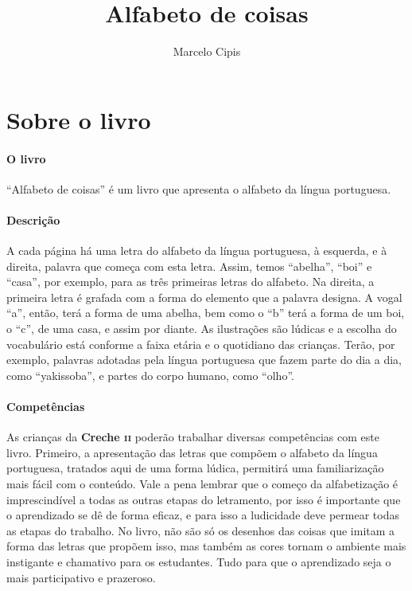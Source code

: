 \documentclass[11pt]{extarticle}
\newcommand{\AutorLivro}{Marcelo Cipis}
\newcommand{\TituloLivro}{Alfabeto de coisas}
\newcommand{\colaborador}{{Paulo Pompermaier e Renier Silva}}
\begin{document}
\title{\TituloLivro}
\author{\AutorLivro}
\def\authornotes{\colaborador}

\date{}
\maketitle


\tableofcontents



\section{Sobre o livro}

\paragraph{O livro} 
``Alfabeto de coisas'' é um livro que apresenta o alfabeto da língua portuguesa. 

\paragraph{Descrição} 
A cada página há uma letra do alfabeto da língua portuguesa, à esquerda, e à direita,
palavra que começa com esta letra. Assim, temos ``abelha'', ``boi'' e ``casa'', por exemplo, 
para as três primeiras letras do alfabeto. 
Na direita, a primeira letra é grafada com a forma do elemento que a palavra designa. A vogal ``a'', então, terá
a forma de uma abelha, bem como o ``b'' terá a forma de um boi, o ``c'', de uma casa, e assim por diante. 
As ilustrações são lúdicas e a escolha do vocabulário está conforme a faixa etária
e o quotidiano das crianças. Terão, por exemplo, palavras adotadas pela língua
portuguesa que fazem parte do dia a dia, como ``yakissoba'', e partes do corpo humano, como ``olho''.

\paragraph{Competências} 
As crianças da \textbf{Creche \textsc{ii}} poderão trabalhar diversas competências
com este livro. Primeiro, a apresentação das letras que compõem o alfabeto
da língua portuguesa, tratados aqui de uma forma lúdica, permitirá 
uma familiarização mais fácil com o conteúdo. Vale a pena lembrar que o começo
da alfabetização é imprescindível a todas as outras etapas do letramento,
por isso é importante que o aprendizado se dê de forma eficaz, e para isso
a ludicidade deve permear todas as etapas do trabalho. No livro,
não são só os desenhos das coisas que imitam a forma das letras que
propõem isso, mas também as cores tornam o ambiente mais instigante e 
chamativo para os estudantes. Tudo para que o aprendizado seja o mais participativo
e prazeroso. 
\end{document}
